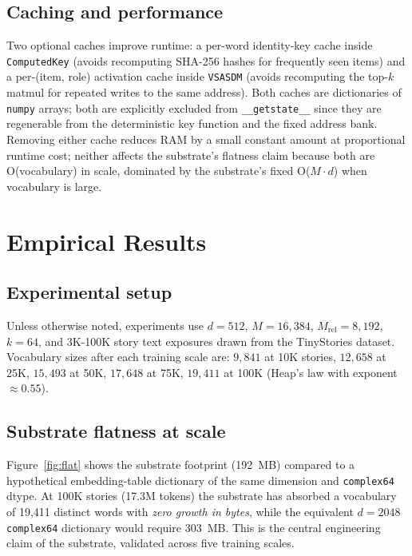\documentclass[11pt,a4paper]{article}
\begin{document}
\subsection{Caching and performance}
Two optional caches improve runtime: a per-word identity-key cache
inside \texttt{ComputedKey} (avoids recomputing SHA-256 hashes for
frequently seen items) and a per-(item, role) activation cache inside
\texttt{VSASDM} (avoids recomputing the top-$k$ matmul for repeated
writes to the same address).  Both caches are dictionaries of
\texttt{numpy} arrays;  both are explicitly excluded from
\texttt{\_\_getstate\_\_} since they are regenerable from the
deterministic key function and the fixed address bank.  Removing
either cache reduces RAM by a small constant amount at proportional
runtime cost;  neither affects the substrate's flatness claim because
both are O(vocabulary) in scale, dominated by the substrate's fixed
O($M \cdot d$) when vocabulary is large.

\section{Empirical Results}
\label{sec:results}

\subsection{Experimental setup}
Unless otherwise noted, experiments use $d = 512$, $M = 16{,}384$,
$M_{\mathrm{rel}} = 8{,}192$, $k = 64$, and 3K-100K story text exposures
drawn from the TinyStories dataset.  Vocabulary sizes after each
training scale are: $9{,}841$ at 10K stories, $12{,}658$ at 25K, $15{,}493$
at 50K, $17{,}648$ at 75K, $19{,}411$ at 100K (Heap's law with exponent
$\approx 0.55$).

\subsection{Substrate flatness at scale}

Figure~\ref{fig:flat} shows the substrate footprint (192~MB) compared
to a hypothetical embedding-table dictionary of the same dimension and
\texttt{complex64} dtype.  At 100K stories (17.3M tokens) the substrate
has absorbed a vocabulary of 19{,}411 distinct words with \emph{zero
growth in bytes}, while the equivalent $d{=}2048$ \texttt{complex64}
dictionary would require 303~MB.  This is the central engineering claim
of the substrate, validated across five training scales.
\end{document}
